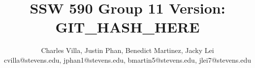 %

\begin{titlepage}
        \title{SSW 590 Group 11 Version: GIT\_HASH\_HERE}
        \author{Charles Villa, Justin Phan, Benedict Martinez, Jacky Lei \\ cvilla@stevens.edu, jphan1@stevens.edu, bmartin5@stevens.edu, jlei7@stevens.edu }
        \conferraldate{}{\today} \maketitle
\end{titlepage}

\makecopyright

\begin{abstract}
\end{abstract}


% 


\contentspage

\tablelistpage

\figurelistpage
